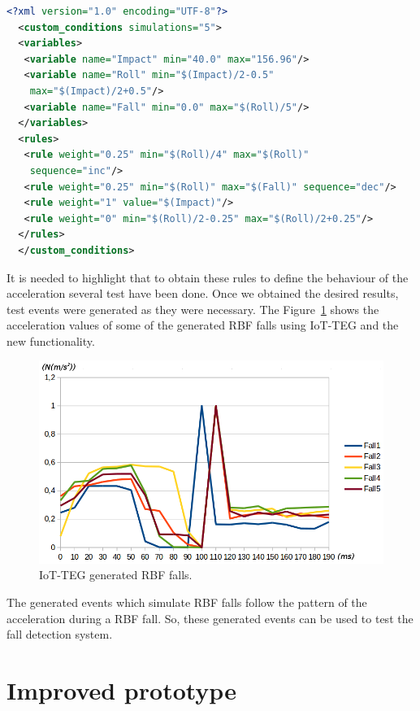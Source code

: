 \documentclass[review]{elsarticle}
\begin{document}
\begin{lstlisting}[basicstyle=\ttfamily\footnotesize,language=XML,caption={Rules to define a RBF fall},label=RBFFallRules]
  <?xml version="1.0" encoding="UTF-8"?>
  <custom_conditions simulations="5">
  <variables>
   <variable name="Impact" min="40.0" max="156.96"/>
   <variable name="Roll" min="$(Impact)/2-0.5" 
    max="$(Impact)/2+0.5"/>
   <variable name="Fall" min="0.0" max="$(Roll)/5"/>
  </variables>
  <rules>
   <rule weight="0.25" min="$(Roll)/4" max="$(Roll)" 
    sequence="inc"/>
   <rule weight="0.25" min="$(Roll)" max="$(Fall)" sequence="dec"/>
   <rule weight="1" value="$(Impact)"/>
   <rule weight="0" min="$(Roll)/2-0.25" max="$(Roll)/2+0.25"/>
  </rules>
  </custom_conditions>
\end{lstlisting}

It is needed to highlight that to obtain these rules to define the behaviour of the acceleration several test
have been done. Once we obtained the desired results, test events were generated as they were necessary. The 
Figure~\ref{fig:IoTTEGRBFGeneratedEvents} shows the acceleration values of some of the generated RBF falls using
IoT-TEG and the new functionality.

\begin{figure}[!ht]
  \centering
  \includegraphics[scale=0.3]{img/IoTTEGRBFGeneratedEvents}
  \caption[IoT-TEG generated RBF falls]{IoT-TEG generated RBF falls.}
  \label{fig:IoTTEGRBFGeneratedEvents}
\end{figure}

The generated events which simulate RBF falls follow the pattern of the acceleration during a RBF fall.
So, these generated events can be used to test the fall detection system.

\section{Improved prototype}
\label{sec:improvedprototype}
\end{document}
